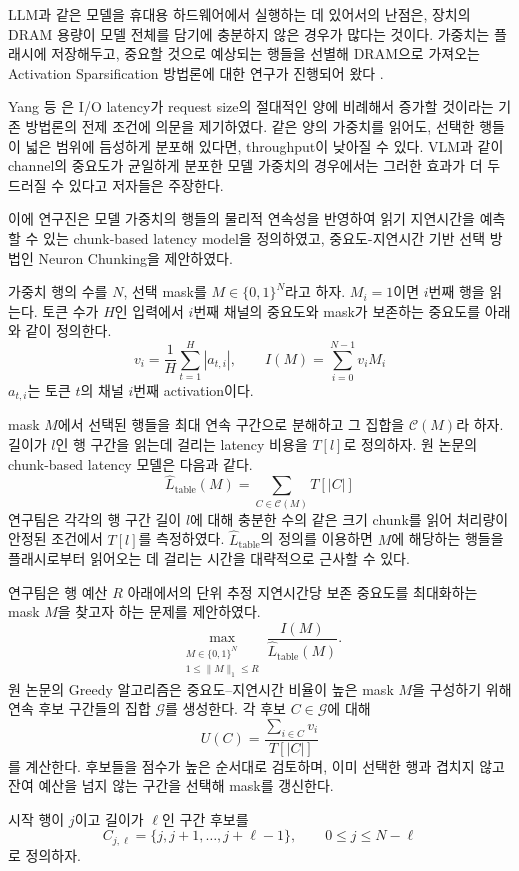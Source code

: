 LLM과 같은 모델을 휴대용 하드웨어에서 실행하는 데 있어서의 난점은, 장치의 DRAM 용량이 모델 전체를 담기에 충분하지 않은 경우가 많다는 것이다. 가중치는 플래시에 저장해두고, 중요할 것으로 예상되는 행들을 선별해 DRAM으로 가져오는 Activation Sparsification 방법론에 대한 연구가 진행되어 왔다 \cite{alizadeh2024}.

Yang 등 \cite{yang2025}은 I/O latency가 request size의 절대적인 양에 비례해서 증가할 것이라는 기존 방법론의 전제 조건에 의문을 제기하였다. 같은 양의 가중치를 읽어도, 선택한 행들이 넓은 범위에 듬성하게 분포해 있다면, throughput이 낮아질 수 있다. VLM과 같이 channel의 중요도가 균일하게 분포한 모델 가중치의 경우에서는 그러한 효과가 더 두드러질 수 있다고 저자들은 주장한다.

이에 연구진은 모델 가중치의 행들의 물리적 연속성을 반영하여 읽기 지연시간을 예측할 수 있는 chunk-based latency model을 정의하였고, 중요도-지연시간 기반 선택 방법인 Neuron Chunking을 제안하였다.

가중치 행의 수를 $N$, 선택 mask를 $M\in\{0,1\}^N$라고 하자. $M_i=1$이면 $i$번째 행을 읽는다. 토큰 수가 $H$인 입력에서 $i$번째 채널의 중요도와 mask가 보존하는 중요도를 아래와 같이 정의한다.
\[
v_i=\frac1H\sum_{t=1}^{H}|a_{t,i}|,
\qquad
I(M)=\sum_{i=0}^{N-1}v_iM_i
\]
$a_{t, i}$는 토큰 $t$의 채널 $i$번째 activation이다.

mask $M$에서 선택된 행들을 최대 연속 구간으로 분해하고 그 집합을 $\mathcal C(M)$라 하자. 길이가 $l$인 행 구간을 읽는데 걸리는 latency 비용을 $T[l]$로 정의하자. 원 논문의 chunk-based latency 모델은 다음과 같다.
\[
\widehat L_{\mathrm{table}}(M)
=\sum_{C\in\mathcal C(M)}T[|C|]
\]
연구팀은 각각의 행 구간 길이 $l$에 대해 충분한 수의 같은 크기 chunk를 읽어 처리량이 안정된 조건에서 $T[l]$를 측정하였다. $\widehat L_{\mathrm{table}}$의 정의를 이용하면 $M$에 해당하는 행들을 플래시로부터 읽어오는 데 걸리는 시간을 대략적으로 근사할 수 있다.

연구팀은 행 예산 $R$ 아래에서의 단위 추정 지연시간당 보존 중요도를 최대화하는 mask $M$을 찾고자 하는 문제를 제안하였다.
\[
\max_{\substack{M\in\{0,1\}^N\\1\le\|M\|_1\le R}}
\frac{I(M)}{\widehat L_{\mathrm{table}}(M)}.
\]
원 논문의 Greedy 알고리즘은 중요도--지연시간 비율이 높은 mask $M$을 구성하기 위해 연속 후보 구간들의 집합 $\mathcal G$를 생성한다. 각 후보 $C\in\mathcal G$에 대해
\[
U(C)=\frac{\sum_{i\in C}v_i}{T[|C|]}
\]
를 계산한다. 후보들을 점수가 높은 순서대로 검토하며, 이미 선택한 행과 겹치지 않고 잔여 예산을 넘지 않는 구간을 선택해 mask를 갱신한다.

시작 행이 $j$이고 길이가 $\ell$인 구간 후보를
\[
C_{j,\ell}=\{j,j+1,\ldots,j+\ell-1\},
\qquad 0\le j\le N-\ell
\]
로 정의하자.

